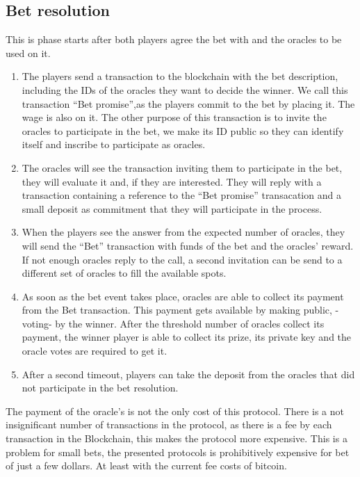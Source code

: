 \subsection{Bet resolution}
This is phase starts after both players agree the bet with and the oracles to
  be used on it.

\begin{enumerate}
  \item The players send a transaction to the blockchain with the bet
      description, including the IDs of the oracles they want to decide the
      winner.
    We call this transaction ``Bet promise'',as the players commit to the bet by
      placing it. The wage is also on it.
    The other purpose of this transaction is to invite the oracles to
      participate in the bet, we make its ID public so they can identify itself
      and inscribe to participate as oracles.
  \item The oracles will see the transaction inviting them to participate in the
      bet, they will evaluate it and, if they are interested.
    They will reply with a transaction containing a reference to the ``Bet
      promise'' transacation and a small deposit as commitment that they will
      participate in the process.
  \item When the players see the answer from the expected number of oracles,
  	  they will send the ``Bet'' transaction with funds of the bet and the
  	  oracles' reward.
  	If not enough oracles reply to the call, a second invitation can be send to
  	  a different set of oracles to fill the available spots.
  \item As soon as the bet event takes place, oracles are able to collect its
  	  payment from the Bet transaction. This payment gets available by making
  	  public, -voting- by the winner.
  	After the threshold number of oracles collect its payment, the winner player
  	  is able to collect its prize, its private key and the oracle votes are
  	  required to get it.
  \item After a second timeout, players can take the deposit from the oracles
  	  that did not participate in the bet resolution.
\end{enumerate}

The payment of the oracle's is not the only cost of this protocol.
There is a not insignificant number of transactions in the protocol, as there
  is a fee by each transaction in the Blockchain, this makes the protocol more
  expensive.
This is a problem for small bets, the presented protocols is prohibitively
  expensive for bet of just a few dollars. At least with the current fee costs
  of bitcoin.

